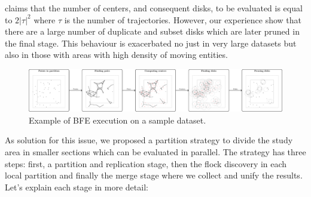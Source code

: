 \cite{vieira_2009} claims that the number of centers, and consequent disks, to be evaluated is equal to $2\lvert\tau\rvert^2$ where $\tau$ is the number of trajectories.  However, our experience show that there are a large number of duplicate and subset disks which are later pruned in the final stage.  This behaviour is exacerbated no just in very large datasets but also in those with areas with high density of moving entities.

\begin{figure}
    \centering
    \includegraphics[width=\linewidth]{figures/MF_stages/flow}
    \caption{Example of BFE execution on a sample dataset.}\label{fig:example}
\end{figure}

As solution for this issue, we proposed a partition strategy to divide the study area in smaller sections which can be evaluated in parallel.  The strategy has three steps: first, a partition and replication stage, then the flock discovery in each local partition and finally the merge stage where we collect and unify the results.  Let's explain each stage in more detail:


